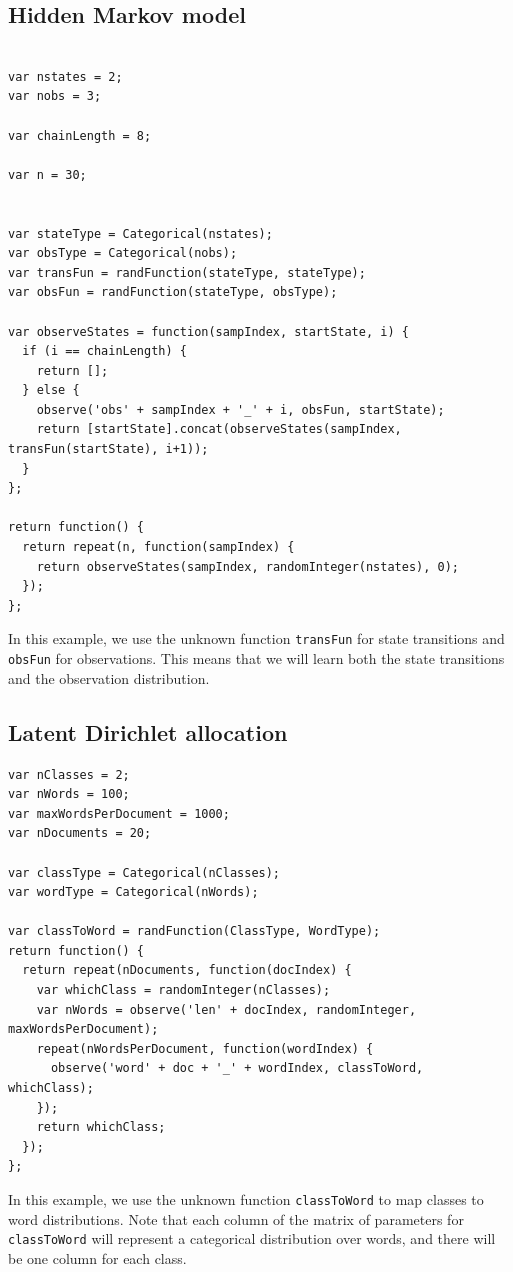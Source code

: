 \documentclass{article}
\begin{document}
  \subsection{Hidden Markov model}
{\small
\begin{verbatim}

var nstates = 2;
var nobs = 3;

var chainLength = 8;

var n = 30;


var stateType = Categorical(nstates);
var obsType = Categorical(nobs);
var transFun = randFunction(stateType, stateType);
var obsFun = randFunction(stateType, obsType);

var observeStates = function(sampIndex, startState, i) {
  if (i == chainLength) {
    return [];
  } else {
    observe('obs' + sampIndex + '_' + i, obsFun, startState);
    return [startState].concat(observeStates(sampIndex, transFun(startState), i+1));
  }
};

return function() {
  return repeat(n, function(sampIndex) {
    return observeStates(sampIndex, randomInteger(nstates), 0);
  });
};
\end{verbatim}
}

In this example, we use the unknown function \texttt{transFun} for state transitions and \texttt{obsFun} for observations.  This means that we will learn both the state transitions and the observation distribution.


\subsection{Latent Dirichlet allocation}
{\small
\begin{verbatim}
var nClasses = 2;
var nWords = 100;
var maxWordsPerDocument = 1000;
var nDocuments = 20;

var classType = Categorical(nClasses);
var wordType = Categorical(nWords);

var classToWord = randFunction(ClassType, WordType);
return function() {
  return repeat(nDocuments, function(docIndex) {
    var whichClass = randomInteger(nClasses);
    var nWords = observe('len' + docIndex, randomInteger, maxWordsPerDocument);
    repeat(nWordsPerDocument, function(wordIndex) {
      observe('word' + doc + '_' + wordIndex, classToWord, whichClass);
    });
    return whichClass;
  });
};
\end{verbatim}
}

In this example, we use the unknown function \texttt{classToWord} to map classes to word distributions.  Note that each column of the matrix of parameters for \texttt{classToWord} will represent a categorical distribution over words, and there will be one column for each class.
\end{document}
